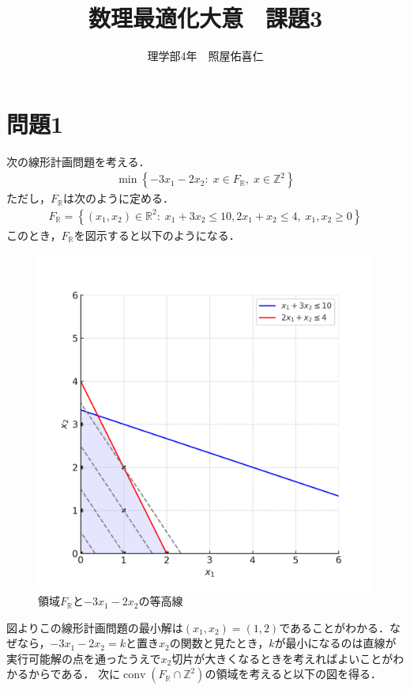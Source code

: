 \documentclass[a4j,uplatex]{jsarticle}
\title{数理最適化大意　課題3}
\author{理学部4年　照屋佑喜仁}
\theoremstyle{definition}
\DeclareMathOperator{\conv}{conv}
\begin{document}
\maketitle
\section{問題1}
次の線形計画問題を考える．
\begin{align*}
    \min \left\{-3x_1-2x_2:\; x\in F_\mathbb{R},\; x\in \mathbb{Z}^2\right\}
\end{align*}
ただし，$F_\mathbb{R}$は次のように定める．
\begin{align*}
    F_\mathbb{R}=\left\{(x_1,x_2)\in\mathbb{R}^2:\; x_1+3x_2\leq10,2x_1+x_2\leq4,\; x_1,x_2\geq0\right\}
\end{align*}
このとき，$F_\mathbb{R}$を図示すると以下のようになる．

\begin{figure}[h]
    \centering
    \includegraphics[width=0.6\linewidth]{lp_region_no_title.png}
    \caption{領域$F_\mathbb{R}$と$-3x_1-2x_2$の等高線}
\end{figure}
図よりこの線形計画問題の最小解は$(x_1,x_2)=(1,2)$であることがわかる．なぜなら，$-3x_1-2x_2=k$と置き$x_2$の関数と見たとき，$k$が最小になるのは直線が実行可能解の点を通ったうえで$x_2$切片が大きくなるときを考えればよいことがわかるからである．
\baselineskip
次に$\conv(F_\mathbb{R}\cap\mathbb{Z}^2)$の領域を考えると以下の図を得る．
\end{document}
